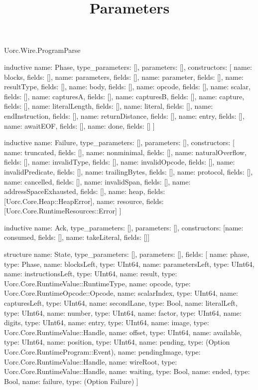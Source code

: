 \begin{lexlean}{Uorc.Wire.ProgramParse}
\title{Parameters}
\begin{semanticmodule}
inductive{
  name: Phase,
  type_parameters: [],
  parameters: [],
  constructors: [
    {name: blocks, fields: []},
    {name: parameters, fields: []},
    {name: parameter, fields: []},
    {name: resultType, fields: []},
    {name: body, fields: []},
    {name: opcode, fields: []},
    {name: scalar, fields: []},
    {name: capturesA, fields: []},
    {name: capturesB, fields: []},
    {name: capture, fields: []},
    {name: literalLength, fields: []},
    {name: literal, fields: []},
    {name: endInstruction, fields: []},
    {name: returnDistance, fields: []},
    {name: entry, fields: []},
    {name: awaitEOF, fields: []},
    {name: done, fields: []}
  ]
}

inductive{
  name: Failure,
  type_parameters: [],
  parameters: [],
  constructors: [
    {name: truncated, fields: []},
    {name: nonminimal, fields: []},
    {name: naturalOverflow, fields: []},
    {name: invalidType, fields: []},
    {name: invalidOpcode, fields: []},
    {name: invalidPredicate, fields: []},
    {name: trailingBytes, fields: []},
    {name: protocol, fields: []},
    {name: cancelled, fields: []},
    {name: invalidSpan, fields: []},
    {name: addressSpaceExhausted, fields: []},
    {name: heap, fields: [Uorc.Core.Heap::HeapError]},
    {name: resource, fields: [Uorc.Core.RuntimeResources::Error]}
  ]
}

inductive{
  name: Ack,
  type_parameters: [],
  parameters: [],
  constructors: [{name: consumed, fields: []}, {name: takeLiteral, fields: []}]
}

structure{
  name: State,
  type_parameters: [],
  parameters: [],
  fields: [
    {name: phase, type: Phase},
    {name: blocksLeft, type: UInt64},
    {name: parametersLeft, type: UInt64},
    {name: instructionsLeft, type: UInt64},
    {name: result, type: Uorc.Core.RuntimeValue::RuntimeType},
    {name: opcode, type: Uorc.Core.RuntimeOpcode::Opcode},
    {name: scalarIndex, type: UInt64},
    {name: capturesLeft, type: UInt64},
    {name: secondLane, type: Bool},
    {name: literalLeft, type: UInt64},
    {name: number, type: UInt64},
    {name: factor, type: UInt64},
    {name: digits, type: UInt64},
    {name: entry, type: UInt64},
    {name: image, type: Uorc.Core.RuntimeValue::Handle},
    {name: offset, type: UInt64},
    {name: available, type: UInt64},
    {name: position, type: UInt64},
    {name: pending, type: (Option Uorc.Core.RuntimeProgram::Event)},
    {name: pendingImage, type: Uorc.Core.RuntimeValue::Handle},
    {name: wireRoot, type: Uorc.Core.RuntimeValue::Handle},
    {name: waiting, type: Bool},
    {name: ended, type: Bool},
    {name: failure, type: (Option Failure)}
  ]
}


\end{semanticmodule}
\end{lexlean}
